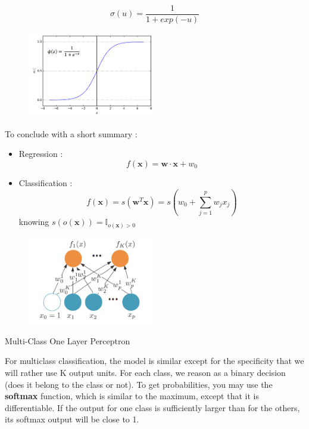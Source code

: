 \documentclass[a4paper,12pt]{article}
\newcommand{\xx}{{\bm x}}
\newcommand{\ww}{{\bm w}}
\begin{document}
\[\sigma(u) = \frac{1}{1+exp(-u)}\]

\begin{figure}[!ht]
\centerline{\includegraphics[width=0.5\textwidth]{./figures/sigmoid_fun.png}}
\end{figure}

\indent 
To conclude with a short summary : 
\begin{itemize}
	\item Regression : \[f(\xx) = \ww \cdot \xx + w_0\]
	\item Classification : \[ f(\xx) = s( \ww ^T\xx) = s (w_0 + \sum_{j=1}^p w_j x_j ) \]
knowing $s(o(\xx)) = \mathbb{I}_{o(\xx) > 0}$
\end{itemize}

\begin{figure}[!ht]
\centerline{\includegraphics[width=0.5\textwidth]{./figures/multicl_1lay_per.png}}
\end{figure}
\centerline{\footnotesize{Multi-Class One Layer Perceptron}}

\vspace{0.1in}

\indent
For multiclass classification, the model is similar except for the specificity that we will rather use K output units. For each class, we reason as a binary decision (does it belong to the class or not). To get probabilities, you may use the {\bfseries softmax} function, which is similar to the maximum, except that it is differentiable. If the output for one class is sufficiently larger than for the others, its softmax output will be close to 1.

\vspace{0.1in}
\end{document}

